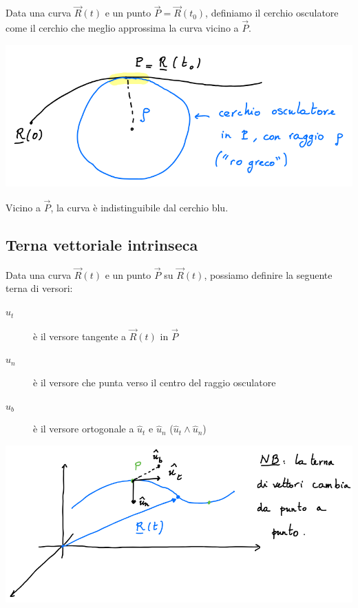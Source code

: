 \documentclass{subfiles}
\begin{document}
Data una curva $\vec{R}(t)$ e un punto $\vec{P} = \vec{R}(t_0)$, definiamo il cerchio osculatore come il cerchio che meglio approssima la curva vicino a $\vec{P}$.

\includegraphics[width=\columnwidth]{cerchio-osculatore}

\noindent
Vicino a $\vec{P}$, la curva è indistinguibile dal cerchio blu.

\subsection{Terna vettoriale intrinseca}

Data una curva $\vec{R}(t)$ e un punto $\vec{P}$ su $\vec{R}(t)$, possiamo definire la seguente terna di versori:

\begin{description}
    \item[$\hat{u}_t$] è il versore tangente a $\vec{R}(t)$ in $\vec{P}$
    \item[$\hat{u}_n$] è il versore che punta verso il centro del raggio osculatore
    \item[$\hat{u}_b$] è il versore ortogonale a $\hat{u}_t$ e $\hat{u}_n$ ($\hat{u}_t \wedge \hat{u}_n$)
\end{description}

\includegraphics[width=\columnwidth]{esempio-terna-vettoriale-intrinseca}
\end{document}
